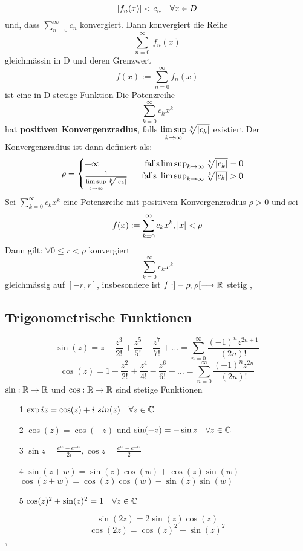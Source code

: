 \[\left\lvert f_n(x) \right\rvert < c_n \quad \forall x \in D \]
und, dass \(\sum_{n=0}^\infty c_n\) konvergiert. Dann konvergiert die Reihe
\[\sum_{n=0}^\infty\ f_n(x)\]
gleichmässin in D und deren Grenzwert
\[f(x) := \sum_{n=0}^{\infty} f_n(x)\]
ist eine in D stetige Funktion \newline
\Def[3.39] Die Potenzreihe
\[\sum_{k=0}^\infty c_kx^k\]
hat \textbf{positiven Konvergenzradius}, falls \(\limsup\limits_{k \rightarrow \infty} \sqrt[k]{\left\lvert c_k \right\rvert}\) existiert
Der Konvergenzradius ist dann definiert als:
\[\rho = \begin{cases}
    +\infty \quad \quad \quad \quad \quad \  \text{falls} \limsup_{k \rightarrow \infty} \sqrt[k]{\left\lvert c_k \right\rvert} = 0 \\
    \frac{1}{\limsup\limits_{c \rightarrow \infty} \sqrt[k]{\left|c_{k}\right|}}  \quad \  \ \text{falls } \limsup_{k \rightarrow \infty} \sqrt[k]{\left\lvert c_k \right\rvert} > 0
    \end{cases}\]
\newline
\Satz[3.40] Sei \(\sum_{k=0}^\infty c_kx^k \) eine Potenzreihe mit positivem Konvergenzradius \(\rho > 0\) und sei 
\[f(x) := \sum_{k=0}^\infty c_kx^k, \left\lvert x \right\rvert < \rho \]
Dann gilt: \(\forall 0 \leq r < \rho \) konvergiert
\[\sum_{k=0}^\infty c_kx^k \]
gleichmässig auf \([-r,r]\), insbesondere ist \newline \(f: ] -\rho,\rho [ \longrightarrow \mathbb{R}\) stetig \newline
\sep
\subsection{Trigonometrische Funktionen}
 \[ \sin(z) = z - \frac{z^3}{2!}+\frac{z^5}{5!}-\frac{z^7}{7!}+ \dots = \sum_{n=0}^{\infty} \frac{(-1)^nz^{2n+1}}{(2n)!}\]
\[ \cos(z) = 1-\frac{z^2}{2!}+\frac{z^4}{4!}-\frac{z^6}{6!}+\dots = \sum_{n=0}^{\infty} \frac{(-1)^nz^{2n}}{(2n)!}\]
\Satz[3.41] \( \sin: \mathbb{R} \rightarrow \mathbb{R} \) und \(\cos: \mathbb{R} \rightarrow \mathbb{R} \) sind stetige Funktionen \newline
\Satz[3.42]
\begin{enumerate}
    \item [1] \( \exp iz = \cos(z) + i \ sin(z) \quad \forall z \in \mathbb{C} \)
    \item [2] \( \cos(z) = \cos(-z)\) und \newline \(\sin(-z) = -\sin z \quad \forall z \in \mathbb{C} \)
    \item [3] \( \sin z = \frac{e^{iz} - e^{-iz}}{2i}, \cos z = \frac{e^{iz} - e^{-iz}}{2}\)
    \item [4] \( \sin(z + w) = \sin(z) \cos(w) + \cos(z) \sin(w)\) \newline
    \( \cos(z + w) = \cos(z) \cos(w) - \sin(z) \sin(w) \)
    \item [5] \( \cos(z)^2 + \sin(z)^2 = 1 \quad \forall z \in \mathbb{C} \)
\end{enumerate}
\Korollar[3.34]
\[\sin(2z) = 2 \sin(z) \cos(z)\]
\[\cos(2z) = \cos(z)^2 - \sin(z)^2\]
\sep
